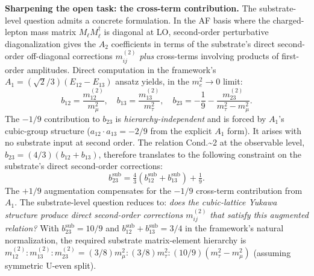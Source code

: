 \documentclass[
]{article}
\begin{document}
\textbf{Sharpening the open task: the cross-term contribution.} The
substrate-level question admits a concrete formulation. In the AF basis
where the charged-lepton mass matrix \(M_\ell M_\ell^\dagger\) is
diagonal at LO, second-order perturbative diagonalization gives the
\(A_2\) coefficients in terms of the substrate's direct second-order
off-diagonal corrections \(m_{ij}^{(2)}\) \emph{plus} cross-terms
involving products of first-order amplitudes. Direct computation in the
framework's \(A_1 = (\sqrt{2}/3)(E_{12}-E_{13})\) ansatz yields, in the
\(m_e^2 \to 0\) limit:
\[b_{12} = \frac{m_{12}^{(2)}}{m_\mu^2}, \quad b_{13} = \frac{m_{13}^{(2)}}{m_\tau^2}, \quad b_{23} = -\frac{1}{9} - \frac{m_{23}^{(2)}}{m_\tau^2 - m_\mu^2}.\]
The \(-1/9\) contribution to \(b_{23}\) is \emph{hierarchy-independent}
and is forced by \(A_1\)'s cubic-group structure
(\(a_{12}\cdot a_{13} = -2/9\) from the explicit \(A_1\) form). It
arises with no substrate input at second order. The relation
Cond.\textasciitilde2 at the observable level,
\(b_{23} = (4/3)(b_{12}+b_{13})\), therefore translates to the following
constraint on the substrate's direct second-order corrections:
\[b_{23}^{\text{sub}} = \tfrac{4}{3}(b_{12}^{\text{sub}} + b_{13}^{\text{sub}}) + \tfrac{1}{9}.\]
The \(+1/9\) augmentation compensates for the \(-1/9\) cross-term
contribution from \(A_1\). The substrate-level question reduces to:
\emph{does the cubic-lattice Yukawa structure produce direct
second-order corrections \(m_{ij}^{(2)}\) that satisfy this augmented
relation?} With \(b_{23}^{\text{sub}} = 10/9\) and
\(b_{12}^{\text{sub}} + b_{13}^{\text{sub}} = 3/4\) in the framework's
natural normalization, the required substrate matrix-element hierarchy
is
\(m_{12}^{(2)} : m_{13}^{(2)} : m_{23}^{(2)} = (3/8)m_\mu^2 : (3/8)m_\tau^2 : (10/9)(m_\tau^2 - m_\mu^2)\)
(assuming symmetric U-even split).
\end{document}
